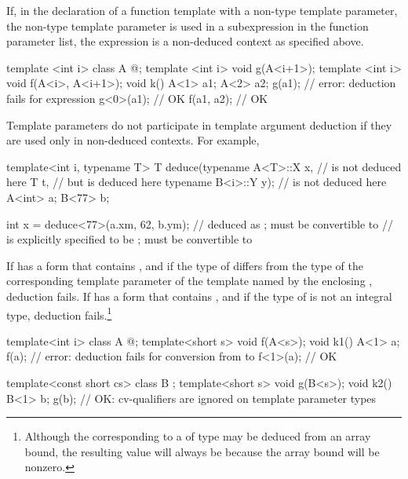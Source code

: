 \pnum
\begin{note}
If, in the declaration of a function template with a non-type
template parameter, the non-type template parameter
is used in a subexpression in the function parameter list,
the expression is a non-deduced context as specified above.
\begin{example}
\begin{codeblock}
template <int i> class A { @\commentellip@ };
template <int i> void g(A<i+1>);
template <int i> void f(A<i>, A<i+1>);
void k() {
  A<1> a1;
  A<2> a2;
  g(a1);                        // error: deduction fails for expression 
  g<0>(a1);                     // OK
  f(a1, a2);                    // OK
}
\end{codeblock}
\end{example}
\end{note}

\pnum
\begin{note}
Template parameters do not participate in template argument deduction if
they are used only in non-deduced contexts.
For example,

\begin{codeblock}
template<int i, typename T>
T deduce(typename A<T>::X x,    //  is not deduced here
         T t,                   // but  is deduced here
         typename B<i>::Y y);   //  is not deduced here
A<int> a;
B<77>  b;

int    x = deduce<77>(a.xm, 62, b.ym);
//  deduced as ;  must be convertible to 
//  is explicitly specified to be ;  must be convertible to 
\end{codeblock}
\end{note}

\pnum
If  has a form that contains , and
if the type of  differs from the type
of the corresponding template parameter
of the template named by the enclosing ,
deduction fails.
If  has a form that contains \tcode{[i]}, and if the type of
 is not an integral type, deduction fails.\footnote{Although the
corresponding to a
of type
may be deduced from an array bound, the resulting value will always be
because the array bound will be nonzero.}
\begin{example}

\begin{codeblock}
template<int i> class A { @\commentellip@ };
template<short s> void f(A<s>);
void k1() {
  A<1> a;
  f(a);             // error: deduction fails for conversion from  to 
  f<1>(a);          // OK
}

template<const short cs> class B { };
template<short s> void g(B<s>);
void k2() {
  B<1> b;
  g(b);             // OK: cv-qualifiers are ignored on template parameter types
}
\end{codeblock}
\end{example}

